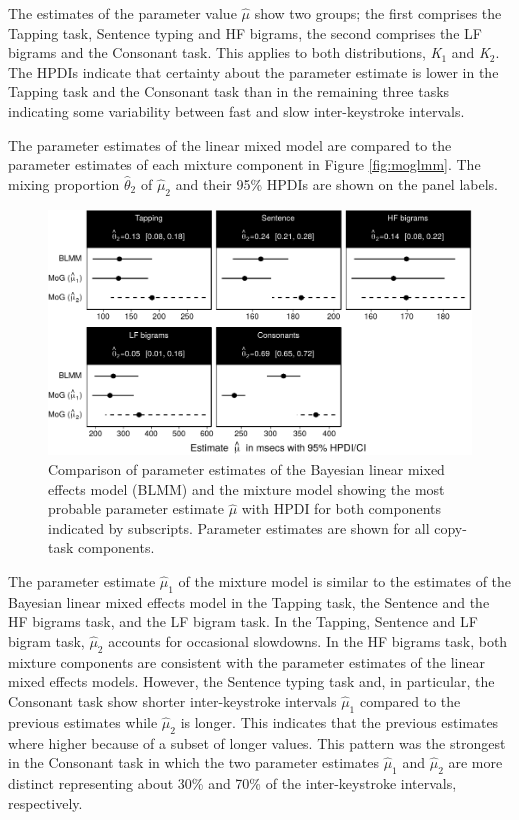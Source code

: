 \documentclass[,man,floatsintext]{apa6}
\begin{document}
The estimates of the parameter value \(\hat\mu\) show two groups; the first comprises the Tapping task, Sentence typing and HF bigrams, the second comprises the LF bigrams and the Consonant task. This applies to both distributions, \textit{K}\(_1\) and \textit{K}\(_2\). The HPDIs indicate that certainty about the parameter estimate is lower in the Tapping task and the Consonant task than in the remaining three tasks indicating some variability between fast and slow inter-keystroke intervals.

The parameter estimates of the linear mixed model are compared to the parameter estimates of each mixture component in Figure \ref{fig:moglmm}. The mixing proportion \(\hat\theta_2\) of \(\hat\mu_2\) and their 95\% HPDIs are shown on the panel labels.

\begin{figure}[!h]

{\centering \includegraphics{ct_files/figure-latex/fig4-1} 

}

\caption{\label{fig:moglmm}Comparison of parameter estimates of the Bayesian linear mixed effects model (BLMM) and the mixture model showing the most probable parameter estimate $\hat\mu$ with HPDI for both components indicated by subscripts. Parameter estimates are shown for all copy-task components.}\label{fig:fig4}
\end{figure}

The parameter estimate \(\hat\mu_1\) of the mixture model is similar to the estimates of the Bayesian linear mixed effects model in the Tapping task, the Sentence and the HF bigrams task, and the LF bigram task. In the Tapping, Sentence and LF bigram task, \(\hat\mu_2\) accounts for occasional slowdowns. In the HF bigrams task, both mixture components are consistent with the parameter estimates of the linear mixed effects models. However, the Sentence typing task and, in particular, the Consonant task show shorter inter-keystroke intervals \(\hat\mu_1\) compared to the previous estimates while \(\hat\mu_2\) is longer. This indicates that the previous estimates where higher because of a subset of longer values. This pattern was the strongest in the Consonant task in which the two parameter estimates \(\hat\mu_1\) and \(\hat\mu_2\) are more distinct representing about 30\% and 70\% of the inter-keystroke intervals, respectively.
\end{document}
